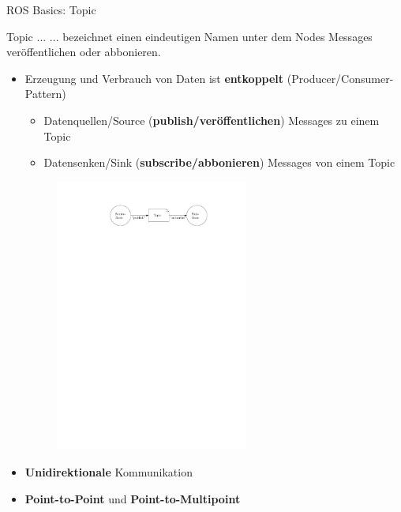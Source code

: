 \documentclass{beamer}
\begin{document}
\begin{frame}{ROS Basics: Topic}
\begin{alertblock}{Topic ...}
... bezeichnet einen eindeutigen Namen unter dem Nodes Messages ver\"offentlichen oder abbonieren.
\end{alertblock}
\begin{itemize}
	\item Erzeugung und Verbrauch von Daten ist \textbf{entkoppelt} (Producer/Consumer-Pattern)
	\begin{itemize}
		\item Datenquellen/Source (\textbf{publish/ver\"offentlichen}) Messages zu einem Topic
		\item Datensenken/Sink (\textbf{subscribe/abbonieren}) Messages von einem Topic
	\end{itemize}
	\begin{figure}[H]
		\centering
		\includegraphics[width=0.6\textwidth]{./images/ros-topic.pdf}
		\label{fig:ros_topic}
	\end{figure}
	\item \textbf{Unidirektionale} Kommunikation
	\item \textbf{Point-to-Point} und \textbf{Point-to-Multipoint}
\end{itemize}
\end{frame}
\end{document}
